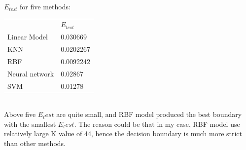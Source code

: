 \documentclass[11pt]{article}
\begin{document}
$E_{test}$ for five methods:

\begin{tabular}{ll}
             & $E_{test}$ \\
Linear Model & 0.030669  \\
KNN          & 0.0202267  \\
RBF          & 0.0092242  \\
Neural network & 0.02867\\
SVM          & 0.01278
\end{tabular}\\
Above five $E_test$ are quite small, and RBF model produced the best boundary with the smallest $E_test$. The reason could be that in my case, RBF model use relatively large K value of 44, hence the decision boundary is much more strict than other methods.
\end{document}

